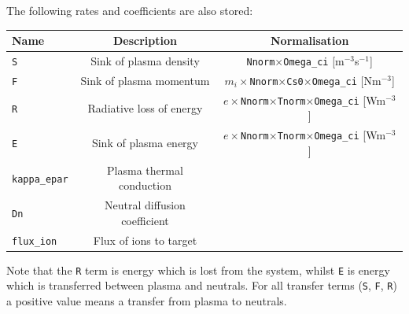 \documentclass[12pt,a4paper]{article}
\begin{document}
\noindent The following rates and coefficients are also stored:
\begin{center}
\begin{tabular}{l c c}
  Name & Description & Normalisation \\
  \hline
  \texttt{S} & Sink of plasma density & \texttt{Nnorm}$\times$\texttt{Omega\_ci} [m$^{-3}$s$^{-1}$] \\
  \texttt{F} & Sink of plasma momentum & $m_i\times$\texttt{Nnorm}$\times$\texttt{Cs0}$\times$\texttt{Omega\_ci} [Nm$^{-3}$] \\
  \texttt{R} & Radiative loss of energy & $e\times$\texttt{Nnorm}$\times$\texttt{Tnorm}$\times$\texttt{Omega\_ci} [Wm$^{-3}$] \\
  \texttt{E} & Sink of plasma energy & $e\times$\texttt{Nnorm}$\times$\texttt{Tnorm}$\times$\texttt{Omega\_ci} [Wm$^{-3}$] \\
  \texttt{kappa\_epar} & Plasma thermal conduction & \\
  \texttt{Dn} & Neutral diffusion coefficient & \\
  \texttt{flux\_ion} & Flux of ions to target &  \\
  \hline
\end{tabular}
\end{center}
Note that the \texttt{R} term is energy which is lost from the system, whilst \texttt{E} is energy which is
transferred between plasma and neutrals. For all transfer terms (\texttt{S}, \texttt{F}, \texttt{R}) a positive value means
a transfer from plasma to neutrals.
\end{document}
